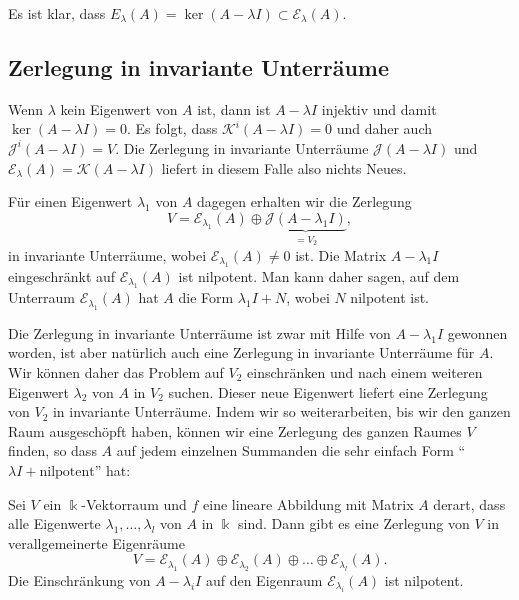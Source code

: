 Es ist klar, dass
$E_\lambda(A)=\ker (A-\lambda I)\subset\mathcal{E}_{\lambda}(A)$.

\subsection{Zerlegung in invariante Unterräume
\label{buch:subsection:zerlegung-in-invariante-unterraeume}}
Wenn $\lambda$ kein Eigenwert von $A$ ist, dann ist $A-\lambda I$
injektiv und damit $\ker(A-\lambda I)=0$.
Es folgt, dass $\mathcal{K}^i(A-\lambda I)=0$ und daher auch
$\mathcal{J}^i(A-\lambda I)=V$.
Die Zerlegung in invariante Unterräume $\mathcal{J}(A-\lambda I)$ und
$\mathcal{E}_\lambda(A)=\mathcal{K}(A-\lambda I)$ liefert in diesem Falle also nichts Neues.

Für einen Eigenwert $\lambda_1$ von $A$ dagegen erhalten wir die Zerlegung
\[
V
=
\mathcal{E}_{\lambda_1}(A)
\oplus
\underbrace{\mathcal{J}(A-\lambda_1 I)}_{\displaystyle =V_2},
\]
in invariante Unterräume,
wobei $\mathcal{E}_{\lambda_1}(A)\ne 0$ ist.
Die Matrix $A-\lambda_1 I$ eingeschränkt auf $\mathcal{E}_{\lambda_1}(A)$ ist
nilpotent.
Man kann daher sagen, auf dem Unterraum $\mathcal{E}_{\lambda_1}(A)$ hat 
$A$ die Form $\lambda_1 I + N$, wobei $N$ nilpotent ist.

Die Zerlegung in invariante Unterräume ist zwar mit Hilfe von $A-\lambda_1I$
gewonnen worden, ist aber natürlich auch eine Zerlegung in invariante 
Unterräume für $A$.
Wir können daher das Problem auf $V_2$ einschränken und nach einem weiteren
Eigenwert $\lambda_2$ von $A$ in $V_2$ suchen.
Dieser neue Eigenwert liefert eine Zerlegung von $V_2$
in invariante Unterräume.
Indem wir so weiterarbeiten, bis wir den ganzen Raum ausgeschöpft haben,
können wir eine Zerlegung des ganzen Raumes $V$ finden, so dass $A$ auf
jedem einzelnen Summanden die sehr einfach Form
``$\lambda I + \text{nilpotent}$'' hat:

\begin{satz}
\label{buch:eigenwerte:satz:zerlegung-in-eigenraeume}
Sei $V$ ein $\Bbbk$-Vektorraum und $f$ eine lineare Abbildung mit Matrix
$A$ derart, dass alle Eigenwerte $\lambda_1,\dots,\lambda_l$ von $A$
in $\Bbbk$ sind.
Dann gibt es eine Zerlegung von $V$ in verallgemeinerte Eigenräume
\[
V
=
\mathcal{E}_{\lambda_1}(A)
\oplus
\mathcal{E}_{\lambda_2}(A)
\oplus
\dots
\oplus
\mathcal{E}_{\lambda_l}(A).
\]
Die Einschränkung von $A-\lambda_{i}I$ auf den Eigenraum 
$\mathcal{E}_{\lambda_i}(A)$ ist nilpotent.
\end{satz}

